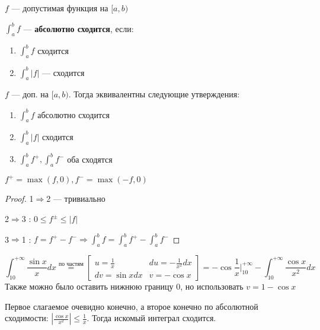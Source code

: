 

\cfoot{}



\begin{definition}
    $f$ --- допустимая функция на $[a, b)$

    $\int_a^b f$ --- \textbf{абсолютно сходится}, если:
    \begin{enumerate}
        \item $\int_a^b f$ сходится
        \item $\int_a^b |f|$ --- сходится
    \end{enumerate}
\end{definition}

\begin{theorem}
    $f$ --- доп. на $[a, b)$. Тогда эквивалентны следующие утверждения:
    \begin{enumerate}
        \item $\int_a^b f$ абсолютно сходится
        \item $\int_a^b |f|$ сходится
        \item $\int_a^b f^+, \int_a^b f^-$ оба сходятся
    \end{enumerate}
\end{theorem}
\begin{remark}
    $f^+ = \max(f, 0), f^- = \max(-f, 0)$
\end{remark}
\begin{proof}
    1$\Rightarrow$2 --- тривиально

    2$\Rightarrow$3 : $0\leq f^{\pm}\leq |f|$

    3$\Rightarrow$1 : $f=f^+ - f^- \Rightarrow \int_a^b f = \int_a^b f^+ - \int_a^b f^-$
\end{proof}

\begin{example}
    $$\int_{10}^{+\infty} \frac{\sin x}{x}dx \stackrel{\text{по частям}}{=} \left[\begin{array}{lr}
        u = \frac{1}{x} & du = -\frac{1}{x^2} dx \\
        dv = \sin x dx & v = -\cos x
    \end{array}\right]=-\cos \frac{1}{x} \bigg|_{10}^{+\infty} - \int_{10}^{+\infty} \frac{\cos x}{x^2} dx$$
    Также можно было оставить нижнюю границу $0$, но использовать $v=1-\cos x$

    Первое слагаемое очевидно конечно, а второе конечно по абсолютной сходимости: $\left|\frac{\cos x}{x^2}\right|\leq \frac{1}{x}$. Тогда искомый интеграл сходится.
\end{example}

